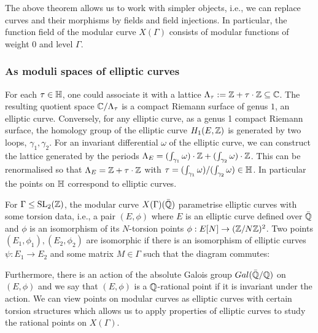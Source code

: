 The above theorem allows us to work with simpler objects, i.e., we can replace curves and their morphisms by fields and field injections. In particular, the function field of the modular curve $X(\Gamma)$ consists of modular functions of weight $0$ and level $\Gamma$. 

\subsubsection{As moduli spaces of elliptic curves}

For each $\tau \in \mathbb{H}$, one could associate it with a lattice $\Lambda_\tau := \mathbb{Z} + \tau \cdot \mathbb{Z} \subseteq \mathbb{C}$. The resulting quotient space $\mathbb{C}/\Lambda_\tau$ is a compact Riemann surface of genus $1$, an elliptic curve. Conversely, for any elliptic curve, as a genus 1 compact Riemann surface, the homology group of the elliptic curve $H_1(E,\mathbb{Z})$ is generated by two loops, $\gamma_1, \gamma_2$. For an invariant differential $\omega$ of the elliptic curve, we can construct the lattice generated by the periods $\Lambda_E = (\int_{\gamma_1} \omega) \cdot \mathbb{Z} + (\int_{\gamma_2} \omega) \cdot \mathbb{Z}$. This can be renormalised so that $\Lambda_E = \mathbb{Z} + \tau \cdot \mathbb{Z}$ with $\tau = (\int_{\gamma_1} \omega) /(\int_{\gamma_2} \omega) \in \mathbb{H}$. In particular the points on $\mathbb{H}$ correspond to elliptic curves.

For $\Gamma \leq \operatorname{SL}_2(\mathbb{Z})$, the modular curve $X(\Gamma)(\bar{\mathbb{Q}})$ parametrise elliptic curves with some torsion data, i.e., a pair $(E, \phi)$ where $E$ is an elliptic curve defined over $\bar{\mathbb{Q}}$ and $\phi$ is an isomorphism of its $N$-torsion points $\phi: E[N] \rightarrow (\mathbb{Z}/N\mathbb{Z})^2$. Two points $(E_1,\phi_1), (E_2,\phi_2)$ are isomorphic if there is an isomorphism of elliptic curves $\psi: E_1 \rightarrow E_2$ and some matrix $M \in \Gamma$ such that the diagram commutes:

\begin{center}
\end{center}


Furthermore, there is an action of the absolute Galois group $Gal(\bar{\mathbb{Q}}/\mathbb{Q})$ on $(E,\phi)$ and we say that $(E,\phi)$ is a $\mathbb{Q}$-rational point if it is invariant under the action. We can view points on modular curves as elliptic curves with certain torsion structures which allows us to apply properties of elliptic curves to study the rational points on $X(\Gamma)$.

